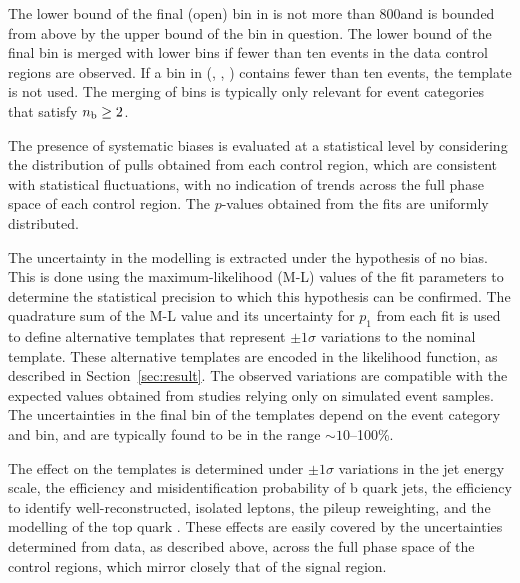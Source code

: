 The lower bound of the final (open) bin in \HTmiss is not more than
800\GeV and is bounded from above by the upper bound of the \scalht
bin in question. The lower bound of the final \HTmiss bin is merged
with lower bins if fewer than ten events in the data control regions
are observed. If a bin in (\njet, \nb, \scalht) contains fewer than ten
events, the \HTmiss template is not used. The merging of bins is
typically only relevant for event categories that satisfy $n_{\text{b}} \geq
2$.

The presence of systematic biases is evaluated at a statistical level
by considering the distribution of pulls obtained from each control
region, which are consistent with statistical fluctuations, with no
indication of trends across the full phase space of each control
region. The $p$-values obtained from the fits are uniformly
distributed.

The uncertainty in the \HTmiss modelling is extracted under the
hypothesis of no bias. This is done using the maximum-likelihood (M-L)
values of the fit parameters to determine the statistical precision to
which this hypothesis can be confirmed. The quadrature sum of the M-L
value and its uncertainty for $p_1$ from each fit is used to define
alternative templates that represent $\pm1\sigma$ variations to the
nominal \HTmiss template. These alternative templates are encoded in
the likelihood function, as described in Section~\ref{sec:result}. The
observed variations are compatible with the expected values obtained
from studies relying only on simulated event samples. The
uncertainties in the final \HTmiss bin of the templates depend on the
event category and \scalht bin, and are typically found to be in the
range $\sim 10$--100\%.

The effect on the \HTmiss templates is determined under $\pm1\sigma$
variations in the jet energy scale, the efficiency and
misidentification probability of b quark jets, the efficiency to
identify well-reconstructed, isolated leptons, the pileup reweighting,
and the modelling of the top quark \Pt. These effects
are easily covered by the uncertainties determined from data, as
described above, across the full phase space of the control regions,
which mirror closely that of the signal region.





